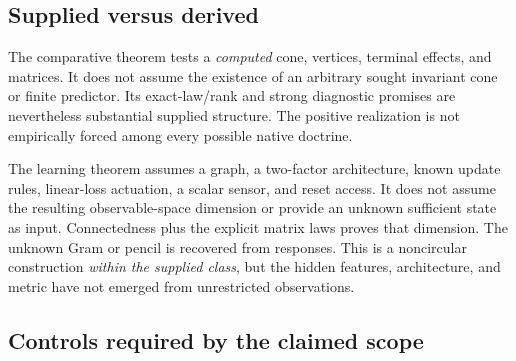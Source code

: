 \documentclass[11pt]{article}
\theoremstyle{remark}
\begin{document}
\subsection{Supplied versus derived}

The comparative theorem tests a \emph{computed} cone, vertices, terminal effects, and matrices. It does not assume the existence of an arbitrary sought invariant cone or finite predictor. Its exact-law/rank and strong diagnostic promises are nevertheless substantial supplied structure. The positive realization is not empirically forced among every possible native doctrine.

The learning theorem assumes a graph, a two-factor architecture, known update rules, linear-loss actuation, a scalar sensor, and reset access. It does not assume the resulting observable-space dimension or provide an unknown sufficient state as input. Connectedness plus the explicit matrix laws proves that dimension. The unknown Gram or pencil is recovered from responses. This is a noncircular construction \emph{within the supplied class}, but the hidden features, architecture, and metric have not emerged from unrestricted observations.

\subsection{Controls required by the claimed scope}
\end{document}

